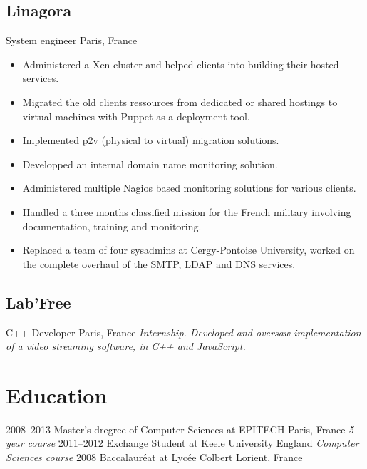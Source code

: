 \documentclass[]{friggeri-cv} %
\begin{document}
\subsection{Linagora}
\begin{entrylist}
 {System engineer} {Paris, France} {
  \begin{itemize}
    \item Administered a Xen cluster and helped clients into building their hosted services.
    \item Migrated the old clients ressources from dedicated or shared hostings to virtual machines with Puppet as a deployment tool.
    \item Implemented p2v (physical to virtual) migration solutions.
    \item Developped an internal domain name monitoring solution.
    \item Administered multiple Nagios based monitoring solutions for various clients.
    \item Handled a three months classified mission for the French military involving documentation, training and monitoring.
    \item Replaced a team of four sysadmins at Cergy-Pontoise University, worked on the complete overhaul of the SMTP, LDAP and DNS services.
  \end{itemize}
}
\end{entrylist}


\subsection{Lab'Free}
\begin{entrylist}
 {C++ Developer} {Paris, France} {
  \emph{Internship. Developed and oversaw implementation of a video streaming software, in C++ and JavaScript.}
}
\end{entrylist}


\section{Education}

\begin{entrylist}
\entry
{2008--2013}
{Master's dregree {\normalfont of Computer Sciences at EPITECH}}
{Paris, France}
{\emph{5 year course}}
\entry
{2011--2012}
{Exchange Student {\normalfont at Keele University}}
{England}
{\emph{Computer Sciences course}}
\entry
{2008}
{Baccalauréat {\normalfont at Lycée Colbert}}
{Lorient, France}
{}
\end{entrylist}
\end{document}
